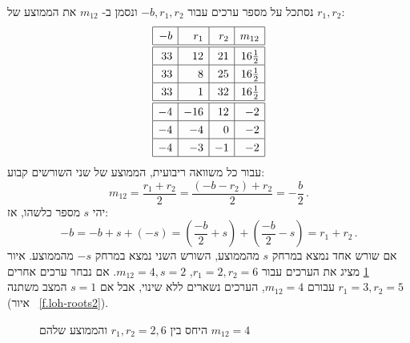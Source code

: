 נסתכל על מספר ערכים עבור
$-b,r_1,r_2$
ונסמן ב-%
$m_{12}$
את הממוצע של
$r_1,r_2$:
\[
\renewcommand{\arraystretch}{1.3}
\begin{array}{|r|r|r|r|}
\hline
-b& r_1 & r_2 &m_{12}\\\hline
\hline
33 & 12 & 21 & 16\frac{1}{2}\\\hline
33 & 8 & 25 & 16\frac{1}{2}\\\hline
33 & 1 & 32 & 16\frac{1}{2}\\\hline
\hline
-4 & -16 & 12 & -2 \\\hline
-4 & -4 & 0 & -2 \\\hline
-4 & -3 & -1 & -2 \\\hline
\end{array}
\]
עבור כל משוואה ריבועית, הממוצע של שני השורשים קבוע:
\[
m_{12}=\frac{r_1+r_2}{2}=
\frac{(-b-r_2)+r_2}{2}=
-\frac{b}{2}\,.
\]
יהי 
$s$ 
מספר כלשהו, אז:
\[
-b=-b+s+(-s)=\left(\frac{-b}{2}+s\right) + \left(\frac{-b}{2}-s\right)=r_1+r_2\,.
\]
אם שורש אחד נמצא במרחק
$s$
מהממוצע, השורש השני נמצא במרחק
$-s$
מהממוצע. איור%
~\ref{f.loh-roots1}
מציג את הערכים עבור
$r_1=2,r_2=6$, $m_{12}=4, s=2$.
אם נבחר ערכים אחרים
$r_1=3,r_2=5$
עבורם
$m_{12}=4$,
הערכים נשארים ללא שינוי, אבל אם
$s=1$
המצב משתנה (איור%
~\ref{f.loh-roots2}).
\begin{figure}[tb]
\begin{center}
\end{center}
\caption{היחס בין 
$r_1,r_2=2,6$
והממוצע שלהם
$m_{12}=4$}
\label{f.loh-roots1}
\end{figure}

